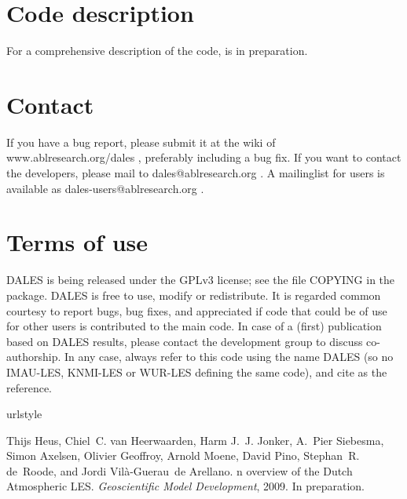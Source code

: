 \documentclass[a4paper,10pt]{article}
\begin{document}
\section{Code description}
For a comprehensive description of the code, \cite{heus2009} is in preparation.
\section{Contact}
If you have a bug report, please submit it at the wiki of www.ablresearch.org/dales , preferably including a bug fix. If you want to contact the developers, please mail to dales@ablresearch.org . A mailinglist for users is available as dales-users@ablresearch.org .
\section{Terms of use}
DALES is being released under the GPLv3 license; see the file COPYING in the package. DALES is free to use, modify or redistribute. It is regarded common courtesy to report bugs, bug fixes, and appreciated if code that could be of use for other users is contributed to the main code.  In case of a (first) publication based on DALES results, please contact the development group to discuss co-authorship. In any case, always refer to this code using the name DALES (so no IMAU-LES, KNMI-LES or WUR-LES defining the same code), and cite \cite{heus2009} as the reference.
\begin{thebibliography}{1}
\providecommand{\natexlab}[1]{#1}
\providecommand{\url}[1]{\texttt{#1}}
\expandafter\ifx\csname urlstyle\endcsname\relax
  \providecommand{\doi}[1]{doi: #1}\else
  \providecommand{\doi}{doi: \begingroup \urlstyle{rm}\Url}\fi

Thijs Heus, Chiel~C. van Heerwaarden, Harm J.~J. Jonker, A.~Pier Siebesma,
  Simon Axelsen, Olivier Geoffroy, Arnold Moene, David Pino, Stephan~R.
  de~Roode, and Jordi Vil\`{a}-Guerau~de Arellano.
n overview of the {D}utch {A}tmospheric {LES}.
\newblock \emph{Geoscientific Model Development}, 2009.
\newblock In preparation.

\end{thebibliography}
\end{document}
